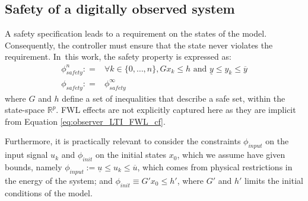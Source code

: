 \documentclass[a4paper,UKenglish]{lipics-v2018}
\newcommand{\mat}[1]{{#1}}
\renewcommand{\vec}[1]{{#1}}
\begin{document}
\subsection{Safety of a digitally observed system}\label{sec:cof_safety}

A safety specification leads to a requirement on the states of the model. 
Consequently, the controller must ensure that the state never violates the
requirement.  In~this work, the safety property is expressed as:
%
\begin{align}
\phi_\mathit{safety}^n: = & \forall k \in \{0, \ldots , n\},
  \mat{G}\vec{x}_k \leq \vec{h} \text{ and } \underline{y} \leq y_k \leq \overline{y} \nonumber\\ 
\phi_\mathit{safety}: = & \phi_\mathit{safety}^\infty
\label{eq:safetyspec}
\end{align}
%
where $\mat{G}$ and $\vec{h}$ define a set of inequalities that describe 
a safe set, within the state-space $\mathbb{R}^p$.
%
FWL effects are not explicitly captured here
as they are implicit from Equation \eqref{eq:observer_LTI_FWL_cf}.

Furthermore, it is practically relevant to consider the constraints
$\phi_\mathit{input}$ on the input signal $u_{k}$ and $\phi_\mathit{init}$
on the initial states $x_0$, which we assume have given bounds, namely
$\phi_\mathit{input} := \underline{u} \leq u_k \leq \overline{u}$, which
comes from physical restrictions in the energy of the system; and
$\phi_\mathit{init}\equiv \mat{G}' \vec{x}_0 \leq \vec{h}'$, where
$\mat{G}'$ and $\vec{h}'$ limits the initial conditions of the model.

%
%
\end{document}
